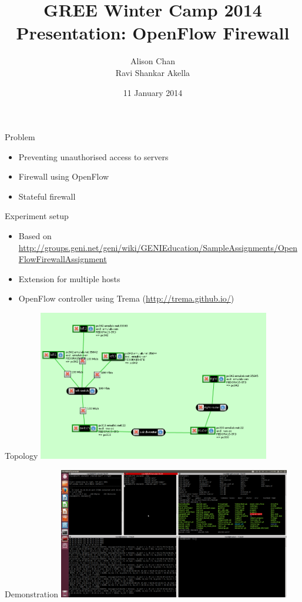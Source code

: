 \documentclass{beamer}
\title[GREE-WC14 Firewall]{GREE Winter Camp 2014 Presentation: OpenFlow Firewall}
\author[Chan \& Akella]{Alison Chan \\ Ravi Shankar Akella}
\institute[Kettering/Missouri]{
  Kettering University \\
  University of Missouri \\
  \url{chan7781@kettering.edu} \\
  \url{raxv8@mail.missouri.edu}
}
\date[2014-01-11]{11 January 2014}
\begin{document}
\begin{frame}[plain]
  \titlepage
\end{frame}

\begin{frame}{Problem}
\begin{itemize}
\item Preventing unauthorised access to servers
\item Firewall using OpenFlow
\item Stateful firewall
\end{itemize}
\end{frame}

\begin{frame}{Experiment setup}
\begin{itemize}
\item Based on \url{http://groups.geni.net/geni/wiki/GENIEducation/SampleAssignments/OpenFlowFirewallAssignment}
\item Extension for multiple hosts
\item OpenFlow controller using Trema (\url{http://trema.github.io/})
\end{itemize}
\end{frame}

\begin{frame}{Topology}
\includegraphics[width=4in]{topology_flack.png}
\end{frame}

\begin{frame}{Demonstration}
\includegraphics[width=4in]{screenshot.png}
\end{frame}
\end{document}
